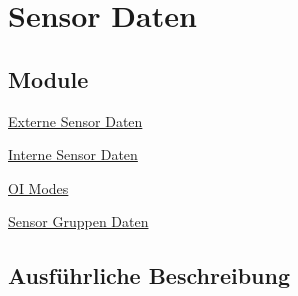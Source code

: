 \hypertarget{group__roomba__sensor}{\section{Sensor Daten}
\label{group__roomba__sensor}
}
\subsection*{Module}
\begin{DoxyCompactItemize}
\item 
\hyperlink{group__roomba__sensor__extern}{Externe Sensor Daten}
\item 
\hyperlink{group__roomba__sensor__intern}{Interne Sensor Daten}
\item 
\hyperlink{group__roomba__oi__modes}{O\-I Modes}
\item 
\hyperlink{group__roomba__sensor__group}{Sensor Gruppen Daten}
\end{DoxyCompactItemize}


\subsection{Ausführliche Beschreibung}
